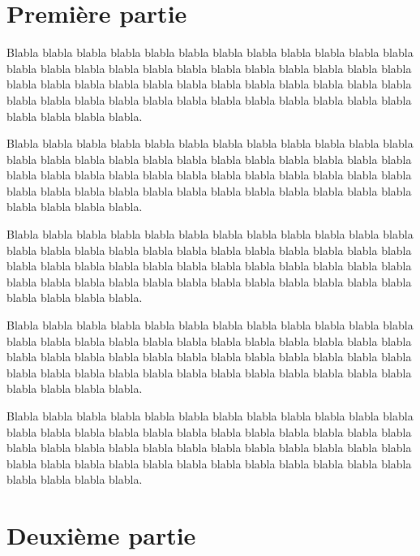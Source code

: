 \documentclass{article}
\begin{document}
\section{Première partie}

Blabla blabla blabla blabla blabla blabla blabla blabla blabla blabla blabla blabla blabla
blabla blabla blabla blabla blabla blabla blabla blabla blabla blabla blabla blabla blabla
blabla blabla blabla blabla blabla blabla blabla blabla blabla blabla blabla blabla blabla
blabla blabla blabla blabla blabla blabla blabla blabla blabla blabla blabla blabla blabla.

\begin{theoreme}
Blabla blabla blabla blabla blabla blabla blabla blabla blabla blabla blabla blabla blabla
blabla blabla blabla blabla blabla blabla blabla blabla blabla blabla blabla blabla blabla
blabla blabla blabla blabla blabla blabla blabla blabla blabla blabla blabla blabla blabla
blabla blabla blabla blabla blabla blabla blabla blabla blabla blabla blabla blabla blabla.
\end{theoreme}

Blabla blabla blabla blabla blabla blabla blabla blabla blabla blabla blabla blabla blabla
blabla blabla blabla blabla blabla blabla blabla blabla blabla blabla blabla blabla blabla
blabla blabla blabla blabla blabla blabla blabla blabla blabla blabla blabla blabla blabla
blabla blabla blabla blabla blabla blabla blabla blabla blabla blabla blabla blabla blabla.

\begin{theoreme}
Blabla blabla blabla blabla blabla blabla blabla blabla blabla blabla blabla blabla blabla
blabla blabla blabla blabla blabla blabla blabla blabla blabla blabla blabla blabla blabla
blabla blabla blabla blabla blabla blabla blabla blabla blabla blabla blabla blabla blabla
blabla blabla blabla blabla blabla blabla blabla blabla blabla blabla blabla blabla blabla.
\end{theoreme}

Blabla blabla blabla blabla blabla blabla blabla blabla blabla blabla blabla blabla blabla
blabla blabla blabla blabla blabla blabla blabla blabla blabla blabla blabla blabla blabla
blabla blabla blabla blabla blabla blabla blabla blabla blabla blabla blabla blabla blabla
blabla blabla blabla blabla blabla blabla blabla blabla blabla blabla blabla blabla blabla.


\section{Deuxième partie}
\end{document}
